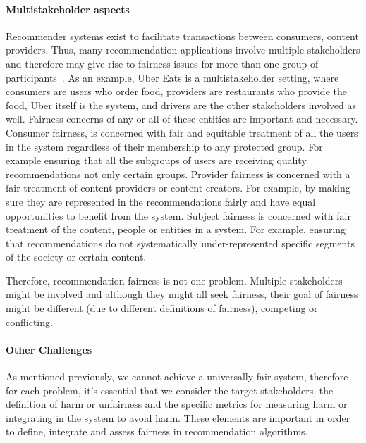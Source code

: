 \paragraph{Multistakeholder aspects}
Recommender systems exist to facilitate transactions between consumers, content providers. Thus, many recommendation applications involve multiple stakeholders and therefore may give rise to fairness issues for more than one group of participants~\cite{burke_multisided_2017}.
As an example, Uber Eats is a multistakeholder setting, where consumers are users who order food, providers are restaurants who provide the food, Uber itself is the system, and drivers are the other stakeholders involved as well. Fairness concerns of any or all of these entities are important and necessary.
Consumer fairness, is concerned with fair and equitable treatment of all the users in the system regardless of their membership to any protected group. For example ensuring that all the subgroups of users are receiving quality recommendations not only certain groups. Provider fairness is concerned with a fair treatment of content providers or content creators. For example, by making sure they are represented in the recommendations fairly and have equal opportunities to benefit from the system. Subject fairness is concerned with fair treatment of the content, people or entities in a system. For example, ensuring that recommendations do not systematically under-represented specific segments of the society or certain content.

Therefore, recommendation fairness is not one problem. Multiple stakeholders might be involved and although they might all seek fairness, their goal of fairness might be different (due to different definitions of fairness), competing or conflicting.
    

\paragraph{Other Challenges}

As mentioned previously, we cannot achieve a universally fair system, therefore for each problem, it's essential that we consider the target stakeholders, the definition of harm or unfairness and the specific metrics for measuring harm or integrating in the system to avoid harm. These elements are important in order to define, integrate and assess fairness in recommendation algorithms.

